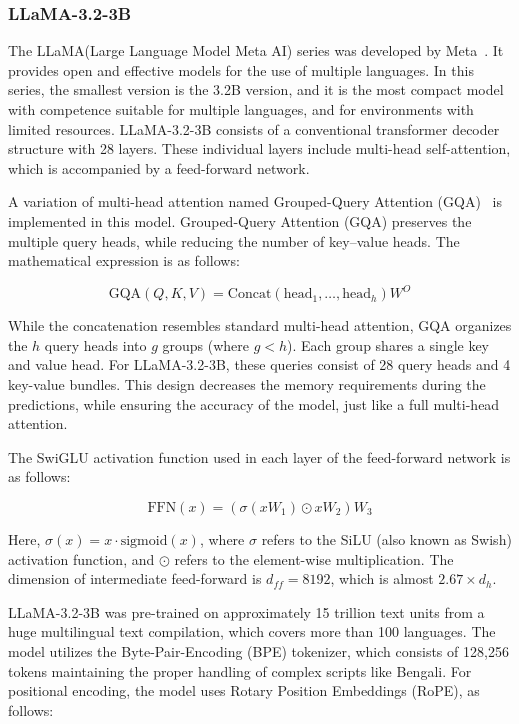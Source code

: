 \documentclass[10pt,letterpaper]{article}
\begin{document}
\subsubsection*{LLaMA-3.2-3B}

The LLaMA(Large Language Model Meta AI) series was developed by Meta~\cite{b36}. It provides open and effective models for the use of multiple languages. In this series, the smallest version is the 3.2B version, and it is the most compact model with competence suitable for multiple languages, and for environments with limited resources. LLaMA-3.2-3B consists of a conventional transformer decoder structure with 28 layers. These individual layers include multi-head self-attention, which is accompanied by a feed-forward network.

A variation of multi-head attention named Grouped-Query Attention (GQA)~\cite{b42} is implemented in this model. Grouped-Query Attention (GQA) preserves the multiple query heads, while reducing the number of key–value heads. The mathematical expression is as follows:    

\begin{equation}
\text{GQA}(Q,K,V)=\text{Concat}(\text{head}_1,\dots,\text{head}_h)W^O
\label{eq:gqa}
\end{equation}

While the concatenation resembles standard multi-head attention, GQA organizes the \(h\) query heads into \(g\) groups (where \(g < h\)). Each group shares a single key and value head. For LLaMA-3.2-3B, these queries consist of 28 query heads and 4 key-value bundles. This design decreases the memory requirements during the predictions, while ensuring the accuracy of the model, just like a full multi-head attention. 

The SwiGLU activation function used in each layer of the feed-forward network is as follows: 

\begin{equation}
\text{FFN}(x) = (\sigma(xW_1) \odot xW_2)W_3
\label{eq:swiglu}
\end{equation}

Here, \(\sigma(x) = x \cdot \text{sigmoid}(x)\), where \(\sigma\) refers to the SiLU (also known as Swish) activation function, and \(\odot\) refers to the element-wise multiplication. The dimension of intermediate feed-forward is \(d_{ff} = 8192\), which is almost \(2.67 \times d_h\).

LLaMA-3.2-3B was pre-trained on approximately 15 trillion text units from a huge multilingual text compilation, which covers more than 100 languages. The model utilizes the Byte-Pair-Encoding (BPE) tokenizer, which consists of 128,256 tokens maintaining the proper handling of complex scripts like Bengali. For positional encoding, the model uses Rotary Position Embeddings (RoPE), as follows:
\end{document}
